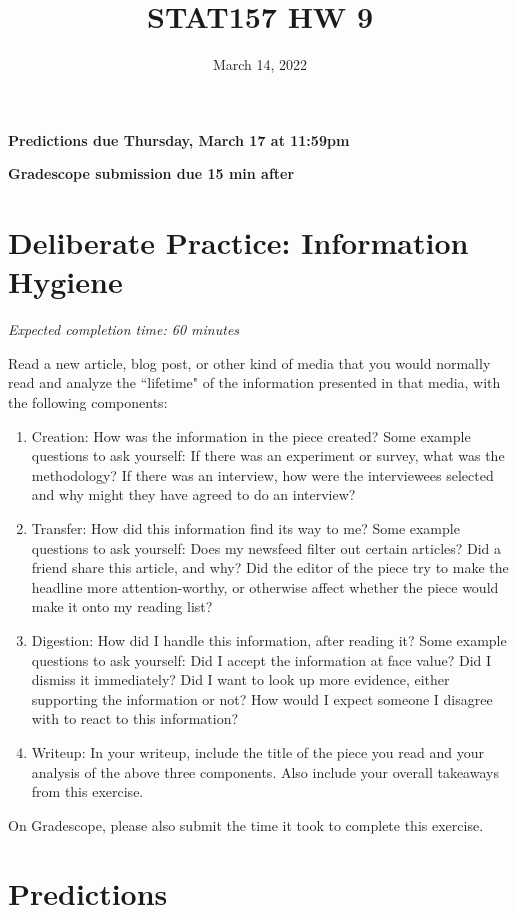 \documentclass[11pt]{article}
\title{STAT157 HW 9}
\date{March 14, 2022}
\begin{document}
\maketitle

\hfill \textbf{Predictions due Thursday, March 17 at 11:59pm}

\hfill \textbf{Gradescope submission due 15 min after}


\section*{Deliberate Practice: Information Hygiene}

\emph{Expected completion time: 60 minutes}

Read a new article, blog post, or other kind of media that you would normally read and analyze the ``lifetime" of the information presented in that media, with the following components:
\begin{enumerate}
	\item Creation: How was the information in the piece created? Some example questions to ask yourself: If there was an experiment or survey, what was the methodology? If there was an interview, how were the interviewees selected and why might they have agreed to do an interview? 
	\item Transfer: How did this information find its way to me? Some example questions to ask yourself: Does my newsfeed filter out certain articles? Did a friend share this article, and why? Did the editor of the piece try to make the headline more attention-worthy, or otherwise affect whether the piece would make it onto my reading list?
	\item Digestion: How did I handle this information, after reading it? Some example questions to ask yourself: Did I accept the information at face value? Did I dismiss it immediately? Did I want to look up more evidence, either supporting the information or not? How would I expect someone I disagree with to react to this information?
	\item Writeup: In your writeup, include the title of the piece you read and your analysis of the above three components. Also include your overall takeaways from this exercise.
\end{enumerate}

On Gradescope, please also submit the time it took to complete this exercise.


\section*{Predictions}
\end{document}
